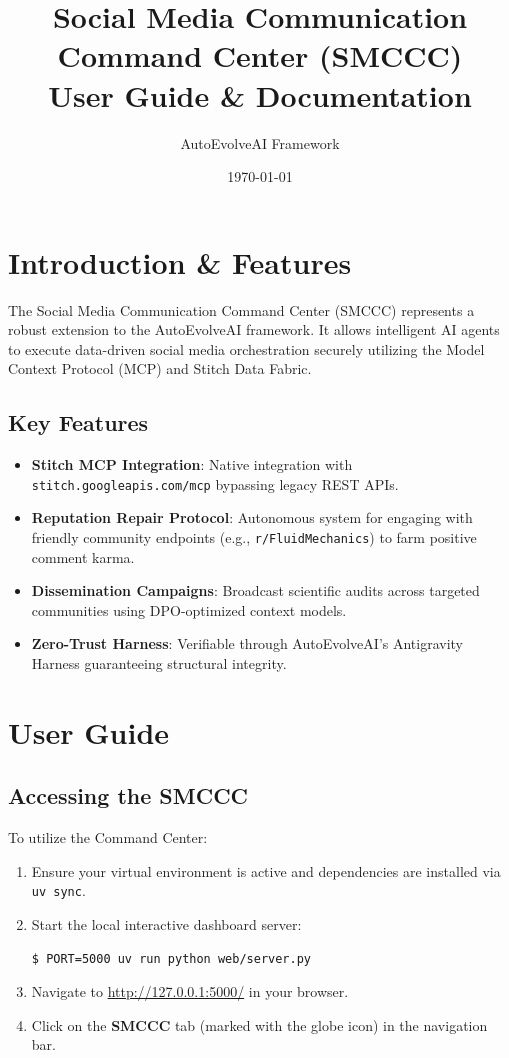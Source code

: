 \documentclass[12pt,a4paper]{article}
\title{\textbf{Social Media Communication Command Center (SMCCC) \\ User Guide \& Documentation}}
\author{AutoEvolveAI Framework}
\date{\today}
\begin{document}
\maketitle
\tableofcontents
\newpage

\section{Introduction \& Features}
The Social Media Communication Command Center (SMCCC) represents a robust extension to the AutoEvolveAI framework. It allows intelligent AI agents to execute data-driven social media orchestration securely utilizing the Model Context Protocol (MCP) and Stitch Data Fabric.

\subsection{Key Features}
\begin{itemize}
    \item \textbf{Stitch MCP Integration}: Native integration with \texttt{stitch.googleapis.com/mcp} bypassing legacy REST APIs.
    \item \textbf{Reputation Repair Protocol}: Autonomous system for engaging with friendly community endpoints (e.g., \texttt{r/FluidMechanics}) to farm positive comment karma.
    \item \textbf{Dissemination Campaigns}: Broadcast scientific audits across targeted communities using DPO-optimized context models.
    \item \textbf{Zero-Trust Harness}: Verifiable through AutoEvolveAI's Antigravity Harness guaranteeing structural integrity.
\end{itemize}

\section{User Guide}
\subsection{Accessing the SMCCC}
To utilize the Command Center:
\begin{enumerate}
    \item Ensure your virtual environment is active and dependencies are installed via \texttt{uv sync}.
    \item Start the local interactive dashboard server:
    \begin{lstlisting}[language=bash,backgroundcolor=\color{lightgray}]
$ PORT=5000 uv run python web/server.py
    \end{lstlisting}
    \item Navigate to \url{http://127.0.0.1:5000/} in your browser.
    \item Click on the \textbf{SMCCC} tab (marked with the globe icon) in the navigation bar.
\end{enumerate}
\end{document}
